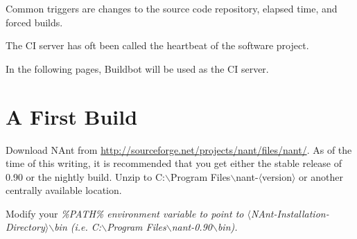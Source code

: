 Common triggers are changes to the source code repository, elapsed time, and forced builds.

The \gls{CI} server has oft been called the heartbeat of the software project.

In the following pages, \gls{Buildbot} will be used as the CI server.

\section{A First Build}

Download \gls{NAnt} from \url{http://sourceforge.net/projects/nant/files/nant/}. As of the time of this writing, it is recommended that you get
either the stable release of 0.90 or the nightly build. Unzip to C:$\backslash$Program Files$\backslash$nant-$\langle$version$\rangle$ or another centrally available 
location.

Modify your \em \%PATH\% \em environment variable to point to $\langle$NAnt-Installation-Directory$\rangle$$\backslash$bin (i.e. C:$\backslash$Program Files$\backslash$nant-0.90$\backslash$bin).
